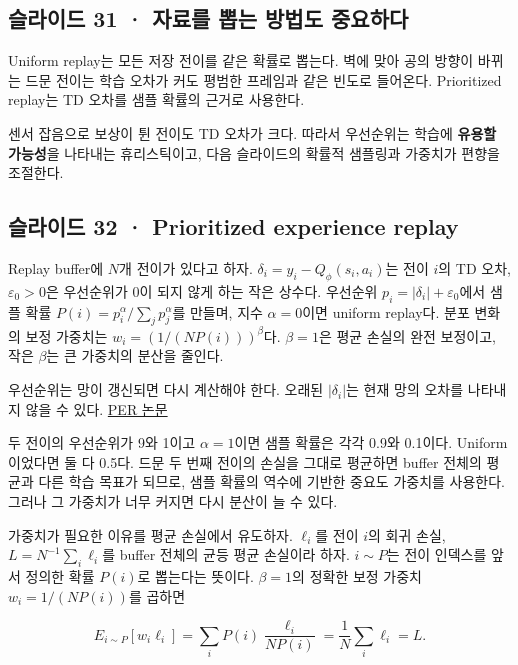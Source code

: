 \documentclass[11pt,a4paper]{article}
\begin{document}
\subsection{슬라이드 31 · 자료를 뽑는 방법도 중요하다}

Uniform replay는 모든 저장 전이를 같은 확률로 뽑는다. 벽에 맞아 공의 방향이 바뀌는 드문 전이는 학습 오차가 커도 평범한 프레임과 같은 빈도로 들어온다. Prioritized replay는 TD 오차를 샘플 확률의 근거로 사용한다.\par

센서 잡음으로 보상이 튄 전이도 TD 오차가 크다. 따라서 우선순위는 학습에 \textbf{유용할 가능성}을 나타내는 휴리스틱이고, 다음 슬라이드의 확률적 샘플링과 가중치가 편향을 조절한다.\par

\subsection{슬라이드 32 · Prioritized experience replay}

Replay buffer에 $N$개 전이가 있다고 하자. $\delta_i=y_i-Q_\phi(s_i,a_i)$는 전이 $i$의 TD 오차, $\varepsilon_0>0$은 우선순위가 0이 되지 않게 하는 작은 상수다. 우선순위 $p_i=|\delta_i|+\varepsilon_0$에서 샘플 확률 $P(i)=p_i^\alpha/\sum_jp_j^\alpha$를 만들며, 지수 $\alpha=0$이면 uniform replay다. 분포 변화의 보정 가중치는 $w_i=(1/(NP(i)))^\beta$다. $\beta=1$은 평균 손실의 완전 보정이고, 작은 $\beta$는 큰 가중치의 분산을 줄인다.\par

우선순위는 망이 갱신되면 다시 계산해야 한다. 오래된 $|\delta_i|$는 현재 망의 오차를 나타내지 않을 수 있다. \href{https://arxiv.org/abs/1511.05952}{PER 논문}\par

두 전이의 우선순위가 9와 1이고 $\alpha=1$이면 샘플 확률은 각각 0.9와 0.1이다. Uniform이었다면 둘 다 0.5다. 드문 두 번째 전이의 손실을 그대로 평균하면 buffer 전체의 평균과 다른 학습 목표가 되므로, 샘플 확률의 역수에 기반한 중요도 가중치를 사용한다. 그러나 그 가중치가 너무 커지면 다시 분산이 늘 수 있다.\par

가중치가 필요한 이유를 평균 손실에서 유도하자. $\ell_i$를 전이 $i$의 회귀 손실, $L=N^{-1}\sum_i\ell_i$를 buffer 전체의 균등 평균 손실이라 하자. $i\sim P$는 전이 인덱스를 앞서 정의한 확률 $P(i)$로 뽑는다는 뜻이다. $\beta=1$의 정확한 보정 가중치 $w_i=1/(NP(i))$를 곱하면\par

\[
E_{i\sim P}[w_i\ell_i]
=\sum_iP(i)\frac{\ell_i}{NP(i)}
=\frac1N\sum_i\ell_i=L.
\]
\end{document}
